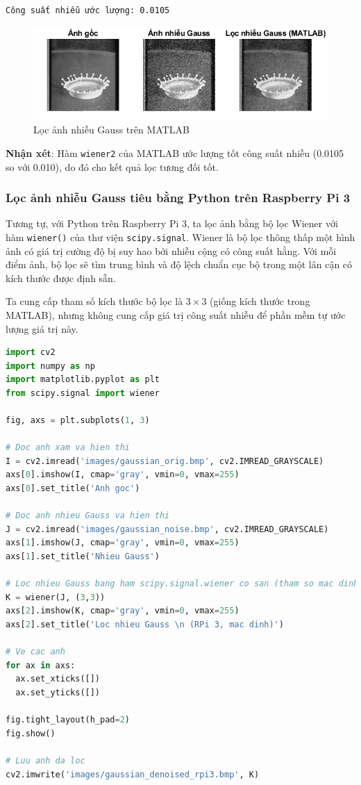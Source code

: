 \begin{verbatim}
Công suất nhiễu ước lượng: 0.0105
\end{verbatim}

\begin{figure}[H]
    \centering
    \includegraphics[width=1\linewidth]{images/gaussian_denoise_matlab.png}
    \caption{Lọc ảnh nhiễu Gauss trên MATLAB}
    \label{fig:gaussian_denoise_matlab}
\end{figure}

\textbf{Nhận xét}: Hàm \texttt{wiener2} của MATLAB ước lượng tốt công suất nhiễu (0.0105 so với 0.010), do đó cho kết quả lọc tương đối tốt. 

\subsubsection{Lọc ảnh nhiễu Gauss tiêu bằng Python trên Raspberry Pi 3}

Tương tự, với Python trên Raspberry Pi 3, ta lọc ảnh bằng bộ lọc Wiener với hàm \texttt{wiener()} của thư viện \texttt{scipy.signal}. Wiener là bộ lọc thông thấp một hình ảnh có giá trị cường độ bị suy hao bởi nhiễu cộng có công suất hằng. Với mỗi điểm ảnh, bộ lọc sẽ tìm trung bình và độ lệch chuẩn cục bộ trong một lân cận có kích thước được định sẵn.

Ta cung cấp tham số kích thước bộ lọc là $3 \times 3$ (giống kích thước trong MATLAB), nhưng không cung cấp giá trị công suất nhiễu để phần mềm tự ước lượng giá trị này. 

\begin{lstlisting}[language=Python]
import cv2
import numpy as np
import matplotlib.pyplot as plt
from scipy.signal import wiener

fig, axs = plt.subplots(1, 3)

# Doc anh xam va hien thi
I = cv2.imread('images/gaussian_orig.bmp', cv2.IMREAD_GRAYSCALE)
axs[0].imshow(I, cmap='gray', vmin=0, vmax=255)
axs[0].set_title('Anh goc')

# Doc anh nhieu Gauss va hien thi
J = cv2.imread('images/gaussian_noise.bmp', cv2.IMREAD_GRAYSCALE)
axs[1].imshow(J, cmap='gray', vmin=0, vmax=255)
axs[1].set_title('Nhieu Gauss')

# Loc nhieu Gauss bang ham scipy.signal.wiener co san (tham so mac dinh) va luu ket qua
K = wiener(J, (3,3))
axs[2].imshow(K, cmap='gray', vmin=0, vmax=255)
axs[2].set_title('Loc nhieu Gauss \n (RPi 3, mac dinh)')

# Ve cac anh
for ax in axs:
  ax.set_xticks([])
  ax.set_yticks([])

fig.tight_layout(h_pad=2)
fig.show()

# Luu anh da loc
cv2.imwrite('images/gaussian_denoised_rpi3.bmp', K)
\end{lstlisting}

